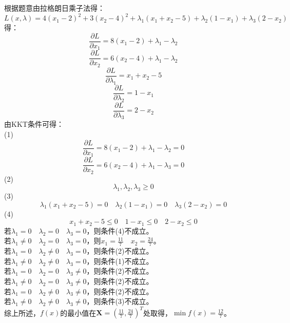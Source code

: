 \documentclass[12pt]{article}
\begin{document}
\section{}
\noindent
根据题意由拉格朗日乘子法得：
\[L(x,\lambda)=4(x_1-2)^2+3(x_2-4)^2+\lambda _1(x_1+x_2-5)+\lambda _2(1-x_1)+\lambda _3(2-x_2)\]
得：
\[   \frac{\partial L}{\partial x_1}=8(x_1-2)+\lambda _1-\lambda _2 \] 
\[   \frac{\partial L}{\partial x_2}=6(x_2-4)+\lambda _1-\lambda _2 \] 
\[   \frac{\partial L}{\partial \lambda _1}=x_1+x_2-5 \] 
\[   \frac{\partial L}{\partial \lambda _2}=1-x_1 \] 
\[   \frac{\partial L}{\partial \lambda _3}=2-x_2 \] 
由KKT条件可得：\\
(1)\[\frac{\partial L}{\partial x_1}=8(x_1-2)+\lambda _1-\lambda _2=0\]
\[   \frac{\partial L}{\partial x_2}=6(x_2-4)+\lambda _1-\lambda _3=0\] 
(2) 
\[ \lambda _1,\lambda _2,\lambda _3 \geq 0\]
(3)
\[\lambda _1(x_1+x_2-5)=0  \quad \lambda _2(1-x_1)=0 \quad \lambda _3(2-x_2)=0 \]
(4)
\[x_1+x_2-5 \leq 0 \quad 1-x_1\leq 0 \quad 2-x_2\leq 0\]
若$\lambda _1=0 \quad \lambda _2=0 \quad \lambda _3=0$，则条件(4)不成立。\\
若$\lambda _1 \neq 0 \quad \lambda _2=0 \quad \lambda _3=0$，则$x_1=\frac{11}{7} \quad x_2=\frac{24}{7}$。\\
若$\lambda _1=0 \quad \lambda _2 \neq 0 \quad \lambda _3=0$，则条件(2)不成立。\\
若$\lambda _1\neq 0 \quad \lambda _2\neq 0 \quad \lambda _3=0$，则条件(1)不成立。\\
若$\lambda _1=0 \quad \lambda _2=0 \quad \lambda _3 \neq 0$，则条件(2)不成立。\\
若$\lambda _1 \neq 0 \quad \lambda _2=0 \quad \lambda _3\neq 0$，则条件(2)不成立。\\
若$\lambda _1=0 \quad \lambda _2 \neq 0 \quad \lambda _3\neq 0$，则条件(2)不成立。\\
若$\lambda _1\neq 0 \quad \lambda _2\neq 0 \quad \lambda _3\neq 0$，则条件(3)不成立。\\
综上所述，$f(x)$的最小值在$\boldsymbol{X}=(\frac{11}{7},\frac{24}{7})^T$处取得，$\min f(x)=\frac{12}{7}$。
\section{}
\end{document}
